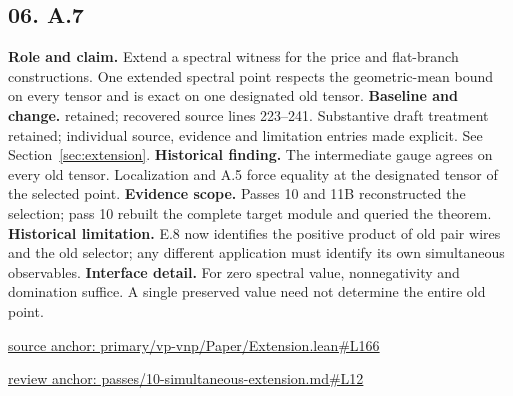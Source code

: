 \documentclass[11pt,letterpaper]{article}
\theoremstyle{definition}\newtheorem{definition}[theorem]{Definition}\newtheorem{example}[theorem]{Example}
\theoremstyle{remark}\newtheorem{remark}[theorem]{Remark}
\begin{document}
\subsection*{06. A.7}
\textbf{Role and claim.} Extend a spectral witness for the price and flat-branch constructions. One extended spectral point respects the geometric-mean bound on every tensor and is exact on one designated old tensor.
\textbf{Baseline and change.} retained; recovered source lines 223--241. Substantive draft treatment retained; individual source, evidence and limitation entries made explicit. See Section~\ref{sec:extension}.
\textbf{Historical finding.} The intermediate gauge agrees on every old tensor. Localization and A.5 force equality at the designated tensor of the selected point.
\textbf{Evidence scope.} Passes 10 and 11B reconstructed the selection; pass 10 rebuilt the complete target module and queried the theorem.
\textbf{Historical limitation.} E.8 now identifies the positive product of old pair wires and the old selector; any different application must identify its own simultaneous observables.
\textbf{Interface detail.} For zero spectral value, nonnegativity and domination suffice. A single preserved value need not determine the entire old point.
\par\href{https://github.com/nousentllc/VP-VNP-Review/blob/8a7976933b6b2b4ffda1ad3a0dfb5fc6b6f023e8/primary/vp-vnp/Paper/Extension.lean\#L166}{source anchor: primary/vp-vnp/Paper/Extension.lean\#L166}
\par\href{https://github.com/nousentllc/VP-VNP-Review/blob/8a7976933b6b2b4ffda1ad3a0dfb5fc6b6f023e8/passes/10-simultaneous-extension.md\#L12}{review anchor: passes/10-simultaneous-extension.md\#L12}
\goodbreak
\end{document}
